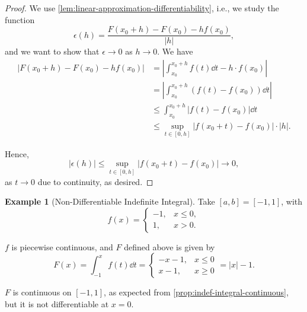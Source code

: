 \documentclass[11pt]{article}
\numberwithin{equation}{section}
\theoremstyle{definition}
\newtheorem{example}[theorem]{Example}
\theoremstyle{remark}
\newcommand{\pqty}[1]{\left(#1\right)}
\newcommand{\abs}[1]{\left|#1\right|}
\newcommand{\ccintv}[2]{[#1,#2]}
\begin{document}
\begin{proof}
    We use \autoref{lem:linear-approximation-differentiability}, i.e., we study the function
    \[
        \epsilon\pqty{h} = \frac{F\pqty{x_0 + h} - F\pqty{x_0} - h f\pqty{x_0}}{\abs{h}},
    \]
    and we want to show that \(\epsilon \to 0\) as \(h \to 0\). We have
    \begin{align*}
        \abs{F\pqty{x_0 + h} - F\pqty{x_0} - h f\pqty{x_0}} &= \abs{\int_{x_0}^{x_0 + h} f\pqty{t} \dd{t} - h \cdot f\pqty{x_0}} \\
        &= \abs{\int_{x_0}^{x_0 + h} \pqty{f\pqty{t} - f\pqty{x_0}} \dd{t}} \\
        &\leq \int_{x_0}^{x_0 + h} \abs{f\pqty{t} - f\pqty{x_0}} \dd{t} \\
        &\leq \sup_{t \in \ccintv{0}{h}} \abs{f\pqty{x_0 + t} - f\pqty{x_0}} \cdot \abs{h}.
    \end{align*}

    Hence,
    \[
        \abs{\epsilon\pqty{h}} \leq \sup_{t \in \ccintv{0}{h}} \abs{f\pqty{x_0 + t} - f\pqty{x_0}} \to 0,
    \]
    as \(t \to 0\) due to continuity, as desired.
\end{proof}

\begin{example}[Non-Differentiable Indefinite Integral]\label{analysis-unit-0168}
    \label{ex:non-differentiable-indefinite-integral}%
    Take \(\ccintv{a}{b} = \ccintv{-1}{1}\), with
    \[
        f\pqty{x} = \begin{cases}
            -1, & x \leq 0, \\
            1, & x > 0.
        \end{cases}
    \]

    \(f\) is piecewise continuous, and \(F\) defined above is given by
    \[
        F\pqty{x} = \int_{-1}^{x} f\pqty{t} \dd{t} = \begin{cases}
            -x - 1, & x \leq 0 \\
            x - 1, & x \geq 0
        \end{cases}
        = \abs{x} - 1.
    \]

    \(F\) is continuous on \(\ccintv{-1}{1}\), as expected from \autoref{prop:indef-integral-continuous}, but it is not differentiable at \(x = 0\).
\end{example}
\end{document}
